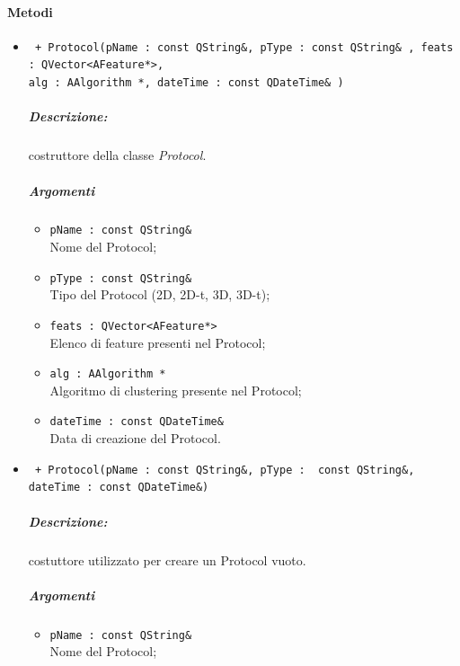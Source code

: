 \color{black}
\pagebreak
\paragraph{Metodi}
	\begin{itemize}
		\item \color{blue}\verb! + Protocol(pName : const QString&, pType : const QString& , feats : QVector<AFeature*>, !\\
								\verb!alg : AAlgorithm *, dateTime : const QDateTime& )!\\
				\color{black}
				\subparagraph{Descrizione:} costruttore della classe \textsl{Protocol}.
				\subparagraph{Argomenti}
					\begin{itemize}
						\item \color{RoyalPurple}\verb!pName : const QString&!\\
						\color{black}Nome del Protocol\g{};
						
						\item \color{RoyalPurple}\verb!pType : const QString&!\\
						\color{black}Tipo del Protocol\g{} (2D, 2D-t, 3D, 3D-t);
						
						\item \color{RoyalPurple}\verb!feats : QVector<AFeature*>!\\
						\color{black}Elenco di feature\g{} presenti nel Protocol\g{};
						
						\item \color{RoyalPurple}\verb!alg : AAlgorithm *!\\
						\color{black}Algoritmo di clustering\g{} presente nel Protocol\g{};
						
						\item \color{RoyalPurple}\verb!dateTime : const QDateTime&!\\
						\color{black}Data di creazione del Protocol\g{}.
					\end{itemize}
			
		\item \color{blue}\verb! + Protocol(pName : const QString&, pType :  const QString&, dateTime : const QDateTime&)!\\
			\color{black}
			\subparagraph{Descrizione:} costuttore utilizzato per creare un Protocol\g{} vuoto.
			\subparagraph{Argomenti}
				\begin{itemize}
					\item \color{RoyalPurple}\verb!pName : const QString&!\\
					\color{black}Nome del Protocol\g{};
					

\end{itemize}
\end{itemize}
